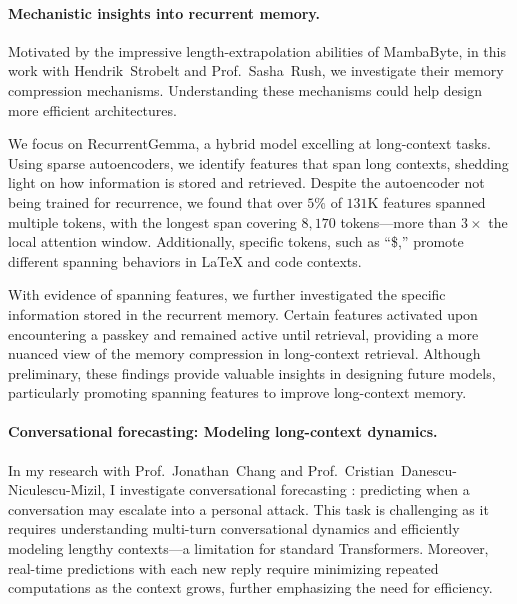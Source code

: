 
\paragraph{Mechanistic insights into recurrent memory.}
% 
Motivated by the impressive length-extrapolation abilities of MambaByte, in this work with Hendrik~Strobelt and Prof.~Sasha~Rush, we investigate their memory compression mechanisms.
% 
Understanding these mechanisms could help design more efficient architectures.

We focus on RecurrentGemma, a hybrid model excelling at long-context tasks.
% 
Using sparse autoencoders, we identify features that span long contexts, shedding light on how information is stored and retrieved.
% 
Despite the autoencoder not being trained for recurrence, we found that over $5\%$ of $131$K features spanned multiple tokens, with the longest span covering $8,170$ tokens---more than $3\times$ the local attention window.
% 
Additionally, specific tokens, such as ``\$,'' promote different spanning behaviors in LaTeX and code contexts.

With evidence of spanning features, we further investigated the specific information stored in the recurrent memory.
% 
Certain features activated upon encountering a passkey and remained active until retrieval, providing a more nuanced view of the memory compression in long-context retrieval.
% 
Although preliminary, these findings provide valuable insights in designing future models, particularly promoting spanning features to improve long-context memory.


\paragraph{Conversational forecasting: Modeling long-context dynamics.}
% 
In my research with Prof.~Jonathan~Chang and Prof.~Cristian~Danescu-Niculescu-Mizil, I investigate conversational forecasting \citep{chang_trouble_2019}: predicting when a conversation may escalate into a personal attack.
%
This task is challenging as it requires understanding multi-turn conversational dynamics and efficiently modeling lengthy contexts---a limitation for standard Transformers.
%
Moreover, real-time predictions with each new reply require minimizing repeated computations as the context grows, further emphasizing the need for efficiency.

